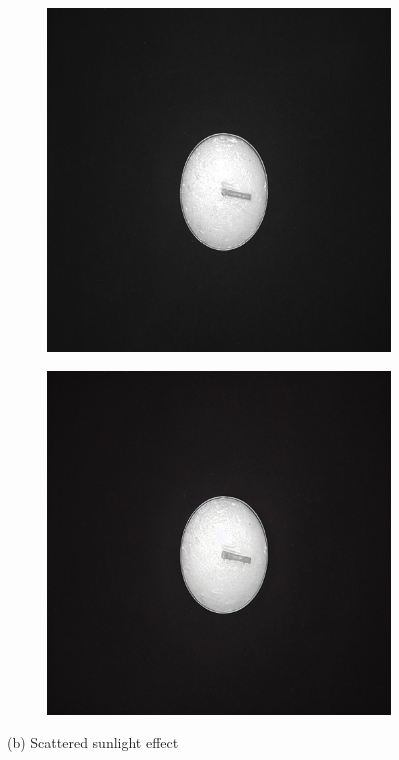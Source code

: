 \documentclass[12pt,DIV14,BCOR12mm,a4paper,footinclude=false,headinclude,parskip=half-,twoside,openright,cleardoublepage=empty,toc=index,bibliography=totoc,listof=totoc]{scrreprt}
\numberwithin{equation}{chapter}
\begin{document}
\begin{figure}
    \begin{subfigure}[t]{0.24\textwidth}
        \centering
        \includegraphics[width=\textwidth]{../media/diff_candles_sunlight_real.png}
    \end{subfigure}%
    \hspace{0.02\textwidth}
    \begin{subfigure}[t]{0.24\textwidth}
        \centering
        \includegraphics[width=\textwidth]{../media/diff_candles_sunlight_fake.png}
    \end{subfigure}
    \caption*{(b) Scattered sunlight effect}


\end{figure}
\end{document}
